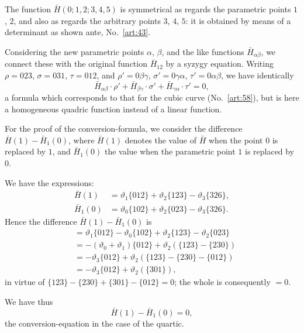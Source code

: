 \documentclass[11pt,a4paper]{book}
\begin{document}
\begin{art}\label{art:75}
The function $\bar{H}(0; 1, 2; 3, 4, 5)$ is symmetrical as regards the parametric points $1$, $2$, and also as regards the arbitrary points $3$, $4$, $5$: it is obtained by means of a determinant as shown ante, No.~\ref{art:43}.
\end{art}

\newpage
\begin{art}\label{art:76}
Considering the new parametric points $\alpha$, $\beta$, and the like functions $\bar{H}_{\alpha\beta}$, we connect these with the original function $\bar{H}_{12}$ by a syzygy equation. Writing $\rho = 023$, $\sigma = 031$, $\tau = 012$, and $\rho' = 0\beta\gamma$, $\sigma' = 0\gamma\alpha$, $\tau' = 0\alpha\beta$, we have identically
\[
\bar{H}_{\alpha\beta} \cdot \rho' + \bar{H}_{\beta\gamma} \cdot \sigma' + \bar{H}_{\gamma\alpha} \cdot \tau' = 0,
\]
a formula which corresponds to that for the cubic curve (No.~\ref{art:58}), but is here a homogeneous quadric function instead of a linear function.
\end{art}

\begin{art}\label{art:77}
For the proof of the conversion-formula, we consider the difference $\bar{H}(1) - \bar{H}_1(0)$, where $\bar{H}(1)$ denotes the value of $\bar{H}$ when the point $0$ is replaced by $1$, and $\bar{H}_1(0)$ the value when the parametric point $1$ is replaced by $0$.
\end{art}

\newpage
\begin{art}\label{art:78}
We have the expressions:
\begin{align*}
\bar{H}(1) &= \vartheta_1\{012\} + \vartheta_2\{123\} - \vartheta_3\{326\},\\
\bar{H}_1(0) &= \vartheta_0\{102\} + \vartheta_2\{023\} - \vartheta_3\{326\}.
\end{align*}
Hence the difference $\bar{H}(1) - \bar{H}_1(0)$ is
\begin{align*}
&= \vartheta_1\{012\} - \vartheta_0\{102\} + \vartheta_2\{123\} - \vartheta_2\{023\}\\
&= -(\vartheta_0 + \vartheta_1)\{012\} + \vartheta_2(\{123\} - \{230\})\\
&= -\vartheta_3\{012\} + \vartheta_2(\{123\} - \{230\} - \{012\})\\
&= -\vartheta_3\{012\} + \vartheta_2(\{301\}),
\end{align*}
in virtue of $\{123\} - \{230\} + \{301\} - \{012\} = 0$; the whole is consequently $= 0$.

We have thus
\[
\bar{H}(1) - \bar{H}_1(0) = 0,
\]
the conversion-equation in the case of the quartic.
\end{art}
\end{document}
